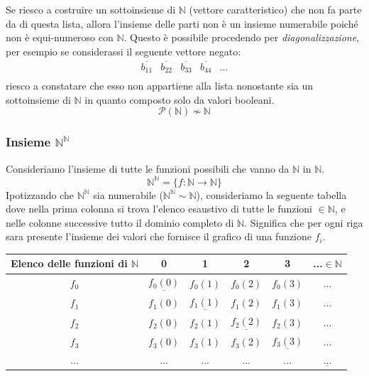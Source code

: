 \documentclass{article}
\begin{document}
Se riesco a costruire un sottoinsieme di $\mathbb{N}$ (vettore caratteristico) che non fa parte da di questa lista,
allora l'insieme delle parti non è un insieme numerabile poiché non è equi-numeroso con $\mathbb{N}$. Questo
è possibile procedendo per \textit{diagonalizzazione}, per esempio se considerassi il seguente vettore negato:
\[
    \begin{array}{ccccc}
        \overline{b_{11}} & \overline{b_{22}} & \overline{b_{33}} & \overline{b_{44}} & ... \\
    \end{array}
\]
riesco a constatare che esso non appartiene alla lista nonostante sia un sottoinsieme di $\mathbb{N}$
in quanto composto solo da valori booleani.
$$\mathcal{P}(\mathbb{N})\nsim\mathbb{N}$$
\subsubsection{Insieme $\mathbb{N}^{\mathbb{N}}$}
Consideriamo l'insieme di tutte le funzioni possibili che vanno da $\mathbb{N}$ in $\mathbb{N}$.
$$\mathbb{N}^{\mathbb{N}}=\{f:\mathbb{N}\rightarrow\mathbb{N}\}$$
Ipotizzando che $\mathbb{N}^{\mathbb{N}}$ sia numerabile ($\mathbb{N}^{\mathbb{N}}\sim\mathbb{N}$),
consideriamo la seguente tabella dove nella prima
colonna si trova l'elenco esaustivo di tutte le funzioni $\in\mathbb{N}$, e nelle colonne successive tutto
il dominio completo di $\mathbb{N}$. Significa che per ogni riga sara presente l'insieme dei valori che
fornisce il grafico di una funzione $f_i$.
\begin{center}
    \begin{tabular}{c|ccccc}
        \toprule
        Elenco delle funzioni di $\mathbb{N}$ & \textbf{0}           & \textbf{1}           & \textbf{2}           & \textbf{3}            & \textbf{...$\in\mathbb{N}$} \\
        \midrule
        $f_0$                                 & $\underline{f_0(0)}$ & $f_0(1)$             & $f_0(2)$             & $f_0(3)$              & $...$                       \\
        $f_1$                                 & $f_1(0)$             & $\underline{f_1(1)}$ & $f_1(2)$             & $f_1(3)$              & $...$                       \\
        $f_2$                                 & $f_2(0)$             & $f_2(1)$             & $\underline{f_2(2)}$ & $f_2(3)$              & $...$                       \\
        $f_3$                                 & $f_3(0)$             & $f_3(1)$             & $f_3(2)$             & $\underline{f_ 3(3)}$ & $...$                       \\
        $...$                                 & $...$                & $...$                & $...$                & $...$                 & $\underline{...}$           \\
        \bottomrule
    \end{tabular}
\end{center}
\end{document}
